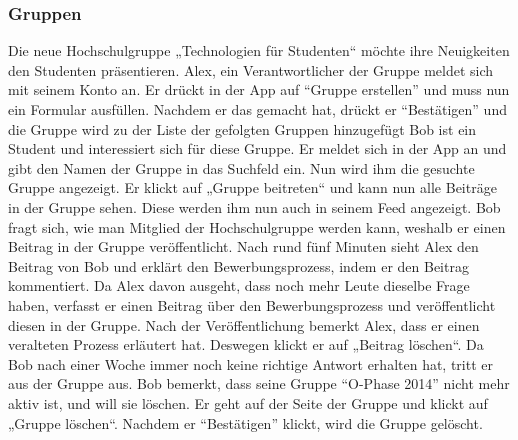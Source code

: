\documentclass[parskip=full]{scrartcl}
\begin{document}
	\subsubsection{Gruppen}
	Die neue Hochschulgruppe „Technologien für Studenten“ möchte ihre Neuigkeiten den Studenten präsentieren. Alex, ein Verantwortlicher der Gruppe meldet sich mit seinem Konto an. Er drückt in der \gls{App} auf “Gruppe erstellen” und muss nun ein Formular ausfüllen. Nachdem er das gemacht hat, drückt er “Bestätigen” und die Gruppe wird zu der Liste der gefolgten Gruppen hinzugefügt %
	Bob ist ein Student und interessiert sich für diese Gruppe. Er meldet sich in der \gls{App} an und gibt den Namen der Gruppe in das Suchfeld ein. Nun wird ihm die gesuchte Gruppe angezeigt. Er klickt auf „Gruppe beitreten“ und kann nun alle Beiträge in der Gruppe sehen. Diese werden ihm nun auch in seinem \gls{Feed} angezeigt. Bob fragt sich, wie man Mitglied der Hochschulgruppe werden kann, weshalb er einen Beitrag in der Gruppe veröffentlicht. Nach rund fünf Minuten sieht Alex den Beitrag von Bob und erklärt den Bewerbungsprozess, indem er den Beitrag kommentiert. Da Alex davon ausgeht, dass noch mehr Leute dieselbe Frage haben, verfasst er einen Beitrag über den Bewerbungsprozess und veröffentlicht diesen in der Gruppe. Nach der Veröffentlichung bemerkt Alex, dass er einen veralteten Prozess erläutert hat. Deswegen klickt er auf „Beitrag löschen“.
	Da Bob nach einer Woche immer noch keine richtige Antwort erhalten hat, tritt er aus der Gruppe aus.
	Bob bemerkt, dass seine Gruppe “O-Phase 2014” nicht mehr aktiv ist, und will sie löschen. Er geht auf der Seite der Gruppe und klickt auf „Gruppe löschen“. Nachdem er “Bestätigen” klickt, wird die Gruppe gelöscht.
	
\end{document}
